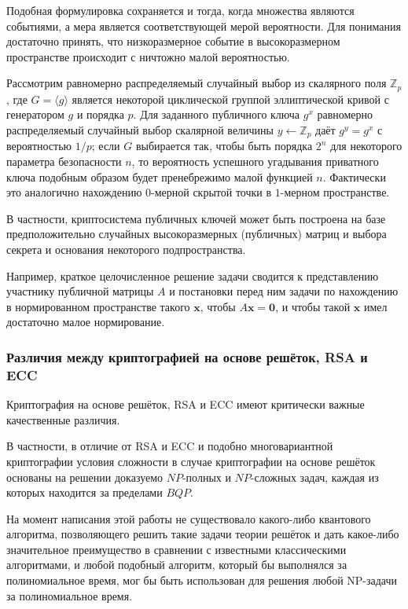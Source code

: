\documentclass{mrl}
\begin{document}
Подобная формулировка сохраняется и тогда, когда множества являются событиями, а мера является соответствующей мерой вероятности. Для понимания достаточно принять, что низкоразмерное событие в высокоразмерном пространстве происходит с ничтожно малой вероятностью.

Рассмотрим равномерно распределяемый случайный выбор из скалярного поля $\mathbb{Z}_{p}$, где $G = \langle g\rangle$ является некоторой циклической группой эллиптической кривой с генератором $g$ и порядка $p$. Для заданного публичного ключа $g^x$ равномерно распределяемый случайный выбор скалярной величины $y \leftarrow \mathbb{Z}_{p}$ даёт $g^y = g^x$ с вероятностью $1/p$; если $G$ выбирается так, чтобы быть порядка $2^n$ для некоторого параметра безопасности $n$, то вероятность успешного угадывания приватного ключа подобным образом будет пренебрежимо малой функцией $n$. Фактически это аналогично нахождению $0$-мерной скрытой точки в $1$-мерном пространстве.

В частности, криптосистема публичных ключей может быть построена на базе предположительно случайных высокоразмерных (публичных) матриц и выбора секрета и основания некоторого подпространства.

Например, краткое целочисленное решение задачи сводится к представлению участнику публичной матрицы $A$ и постановки перед ним задачи по нахождению в нормированном пространстве такого $\textbf{x}$, чтобы $A\textbf{x}=\textbf{0}$, и чтобы такой $\textbf{x}$ имел достаточно малое нормирование.

\subsubsection{Различия между криптографией на основе решёток, RSA и ECC}

Криптография на основе решёток, RSA и ECC имеют критически важные качественные различия.

В частности, в отличие от RSA и ECC и подобно многовариантной криптографии условия сложности в случае криптографии на основе решёток основаны на решении доказуемо $NP$-полных и $NP$-сложных задач, каждая из которых находится за пределами $BQP$.

На момент написания этой работы не существовало какого-либо квантового алгоритма, позволяющего решить такие задачи теории решёток и дать какое-либо значительное преимущество в сравнении с известными классическими алгоритмами, и любой подобный алгоритм, который бы выполнялся за полиномиальное время, мог бы быть использован для решения любой NP-задачи за полиномиальное время.
\end{document}

